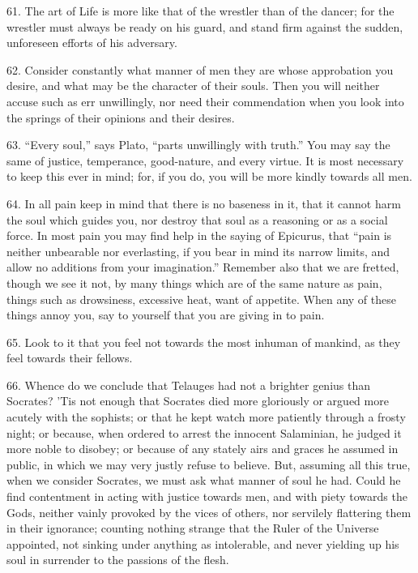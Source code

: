 \documentclass{book}
\begin{document}
61. The art of Life is more like that of the wrestler than of the
dancer; for the wrestler must always be ready on his guard, and stand
firm against the sudden, unforeseen efforts of his adversary.

62. Consider constantly what manner of men they are whose approbation
you desire, and what may be the character of their souls. Then you
will neither accuse such as err unwillingly, nor need their
commendation when you look into the springs of their opinions and
their desires.

63. ``Every soul,'' says Plato, ``parts unwillingly with truth.'' You may
say the same of justice, temperance, good-nature, and every virtue. It
is most necessary to keep this ever in mind; for, if you do, you will
be more kindly towards all men.

64. In all pain keep in mind that there is no baseness in it, that it
cannot harm the soul which guides you, nor destroy that soul as a
reasoning or as a social force. In most pain you may find help in the
saying of Epicurus, that ``pain is neither unbearable nor everlasting,
if you bear in mind its narrow limits, and allow no additions from
your imagination.'' Remember also that we are fretted, though we see it
not, by many things which are of the same nature as pain, things such
as drowsiness, excessive heat, want of appetite. When any of these
things annoy you, say to yourself that you are giving in to pain.

65. Look to it that you feel not towards the most inhuman of mankind,
as they feel towards their fellows.

66. Whence do we conclude that Telauges had not a brighter genius than
Socrates? 'Tis not enough that Socrates died more gloriously or argued
more acutely with the sophists; or that he kept watch more patiently
through a frosty night; or because, when ordered to arrest the
innocent Salaminian, he judged it more noble to disobey; or because of
any stately airs and graces he assumed in public, in which we may very
justly refuse to believe. But, assuming all this true, when we
consider Socrates, we must ask what manner of soul he had. Could he
find contentment in acting with justice towards men, and with piety
towards the Gods, neither vainly provoked by the vices of others, nor
servilely flattering them in their ignorance; counting nothing strange
that the Ruler of the Universe appointed, not sinking under anything
as intolerable, and never yielding up his soul in surrender to the
passions of the flesh.
\end{document}
